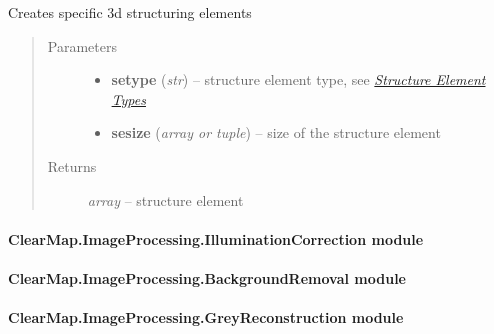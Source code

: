 \documentclass[letterpaper,10pt,english]{sphinxmanual}
\begin{document}

\begin{fulllineitems}
\label{api/ClearMap.ImageProcessing.Filter:ClearMap.ImageProcessing.Filter.StructureElement.structureElement3D}
Creates specific 3d structuring elements
\begin{quote}\begin{description}
\item[{Parameters}] \leavevmode\begin{itemize}
\item {} 
\textbf{setype} (\emph{str}) --
structure element type, see {\hyperref[api/ClearMap.ImageProcessing.Filter:structureelementtypes]{\emph{Structure Element Types}}}

\item {} 
\textbf{sesize} (\emph{array or tuple}) --
size of the structure element

\end{itemize}

\item[{Returns}] \leavevmode
\emph{array} --
structure element

\end{description}\end{quote}

\end{fulllineitems}



\paragraph{ClearMap.ImageProcessing.IlluminationCorrection module}
\label{api/ClearMap.ImageProcessing:clearmap-imageprocessing-illuminationcorrection-module}

\paragraph{ClearMap.ImageProcessing.BackgroundRemoval module}
\label{api/ClearMap.ImageProcessing:clearmap-imageprocessing-backgroundremoval-module}

\paragraph{ClearMap.ImageProcessing.GreyReconstruction module}
\label{api/ClearMap.ImageProcessing:clearmap-imageprocessing-greyreconstruction-module}
\end{document}
